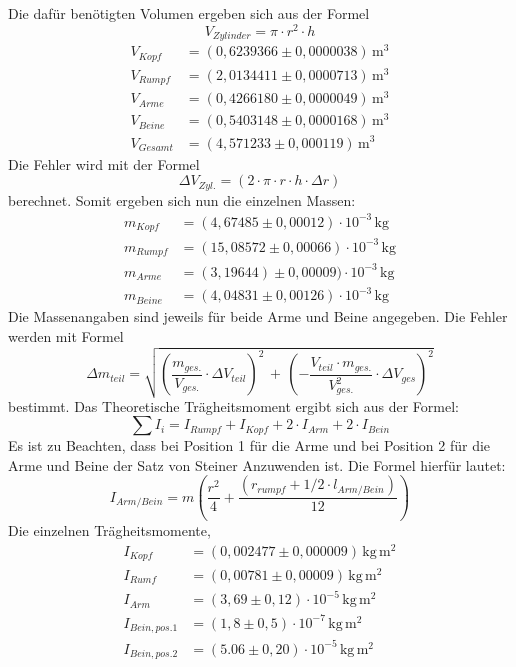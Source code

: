 Die dafür benötigten Volumen ergeben sich aus der Formel
\begin{equation*}
V_{Zylinder}= \pi \cdot r^2 \cdot h
\end{equation*}
\begin{align*}
V_{Kopf} &= (0,6239366 \pm 0,0000038) \, \mathrm{m^3} \\
V_{Rumpf} &= (2,0134411 \pm 0,0000713) \, \mathrm{m^3} \\
V_{Arme} &= (0,4266180 \pm 0,0000049) \, \mathrm{m^3} \\
V_{Beine} &= (0,5403148 \pm 0,0000168) \, \mathrm{m^3} \\
V_{Gesamt} &= (4,571233 \pm 0,000119) \, \mathrm{m^3}
\end{align*}
Die Fehler wird mit der Formel
\begin{equation*}
  \Delta V_{Zyl.}= (2\cdot \pi \cdot r \cdot h \cdot \Delta r)
\end{equation*}
berechnet.
Somit ergeben sich nun die einzelnen Massen:
\begin{align*}
m_{Kopf} &= (4,67485 \pm 0,00012) \cdot 10^{-3} \, \mathrm{kg}\\
m_{Rumpf} &= (15,08572 \pm 0,00066)\cdot 10^{-3} \, \mathrm{kg}\\
m_{Arme} &= (3,19644) \pm 0,00009) \cdot 10^{-3} \, \mathrm{kg}\\
m_{Beine} &= (4,04831 \pm 0,00126) \cdot 10^{-3} \, \mathrm{kg}
\end{align*}
Die Massenangaben sind jeweils für beide Arme und Beine angegeben.
Die Fehler werden mit Formel
\begin{equation*}
  \Delta m_{teil} = \sqrt{\left(\frac{m_{ges.}}{V_{ges.}}\cdot \Delta V_{teil}\right)^2\, + \,
  \left(-\frac{V_{teil} \cdot m_{ges.}}{V_{ges.}^2}\cdot \Delta V_{ges}\right)^2}
\end{equation*}
 bestimmt.
 Das Theoretische Trägheitsmoment ergibt sich aus der Formel:
 \begin{equation}
   \sum I_i = I_{Rumpf} +I_{Kopf} + 2\cdot I_{Arm} + 2\cdot I_{Bein}
 \end{equation}
Es ist zu Beachten, dass bei Position 1 für die Arme und bei Position 2 für die Arme und Beine
der Satz von Steiner Anzuwenden ist.
Die Formel hierfür lautet:
\begin{equation}
  I_{Arm/Bein} = m \left( \frac{r^2}{4} + \frac{\left( r_{rumpf}+{1/2 \cdot l_{Arm/Bein}}\right)}{12}\right)
\end{equation}
Die einzelnen Trägheitsmomente,
\begin{align*}
  I_{Kopf} &= (0,002477 \pm 0,000009) \, \mathrm{kg\, m^2}\\
  I_{Rumf} &= (0,00781 \pm 0,00009) \, \mathrm{kg\, m^2}\\
  I_{Arm} &= (3,69 \pm 0,12) \cdot 10^{-5}\, \mathrm{kg\, m^2}\\
  I_{Bein,pos.1} &= (1,8 \pm 0,5) \cdot 10^{-7}\, \mathrm{kg\, m^2}\\
  I_{Bein,pos.2} &= (5.06 \pm 0,20) \cdot 10^{-5}\, \mathrm{kg\, m^2}
\end{align*}
